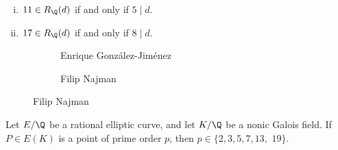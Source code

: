 \begin{frame}[plain,c]
\begin{prop} \hfill
	\begin{enumerate}[(i)]
	\item $11 \in R_\Q(d)$ if and only if $5 \mid d$.
	\item $17 \in R_\Q(d)$ if and only if $8 \mid d$.
	\end{enumerate}
\end{prop}
	\begin{figure}[h]
	\centering
	\begin{subfigure}{0.35\textwidth}
	\captionsetup{labelformat=empty}
	\centering
	\caption{Enrique Gonz\'alez-Jim\'enez}
	\end{subfigure}
	\begin{subfigure}{0.3\textwidth}
	\captionsetup{labelformat=empty}
	\centering
	\caption{Filip Najman}
	\end{subfigure}
	\end{figure}

\begin{lem} \small
Let $E/\Q$ be a rational elliptic curve, and let $K/\Q$ be a nonic Galois field. If $P \in E(K)$ is a point of prime order $p$, then $p \in \{ 2, 3, 5, 7, 13,$ $19 \}$.
\end{lem}
\end{frame}






